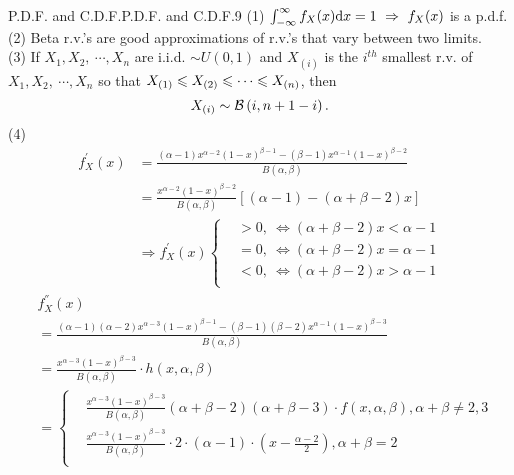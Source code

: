 \documentclass{elegantbook}
\begin{document}
\begin{remark}{P.D.F. and C.D.F.}{P.D.F. and C.D.F.9}
(1) $\int_{-\infty}^{\infty}{f_X(x)\dif x}=1\ \Rightarrow\ f_X(x)$ is a p.d.f.
\vspace{0.4cm}\\
(2) Beta r.v.'s are good approximations of r.v.'s that vary between two limits.\vspace{0.2cm}\\
(3) If $X_1,X_2,\ \cdots,X_n$ are i.i.d. $\sim U(0,1)$ and ${X}_{(i)}$ is the $i^{th}$ smallest r.v. of $X_1,X_2,\ \cdots,X_n$ so that $X_{(1)}\ls{X}_{(2)}\ls\cdots\ls X_{(n)}$, then
$$
{X}_{(i)}\sim\mb\left(i,n+1-i\right).
$$
(4)
$$\begin{aligned}
f_{X}^{'}(x) &= \frac{\left( \alpha - 1 \right)x^{\alpha - 2}\left( 1 - x \right)^{\beta - 1} - (\beta - 1)x^{\alpha - 1}{(1 - x)}^{\beta - 2}}{B(\alpha,\beta)}\\
&= \frac{x^{\alpha - 2}{(1 - x)}^{\beta - 2}}{B(\alpha,\beta)}\left\lbrack \left( \alpha - 1 \right) - \left( \alpha + \beta - 2 \right)x \right\rbrack\\
&\Rightarrow f_{X}^{'}(x)\left\{ \begin{aligned}
 &> 0,\ \Leftrightarrow \left( \alpha + \beta - 2 \right)x < \alpha - 1 \\
 &= 0,\ \Leftrightarrow \left( \alpha + \beta - 2 \right)x = \alpha - 1 \\
 &< 0,\ \Leftrightarrow \left( \alpha + \beta - 2 \right)x > \alpha - 1 \\
\end{aligned} \right.
\end{aligned}$$
$$\begin{aligned}
&f_{X}^{''}(x)\\
&= \frac{\left( \alpha - 1 \right)\left( \alpha - 2 \right)x^{\alpha - 3}\left( 1 - x \right)^{\beta - 1} - (\beta - 1)(\beta - 2)x^{\alpha - 1}{(1 - x)}^{\beta - 3}}{B(\alpha,\beta)}\\
&= \frac{x^{\alpha - 3}{(1 - x)}^{\beta - 3}}{B(\alpha,\beta)}\cdot h(x,\alpha,\beta)\\
&= \left\{ \begin{aligned}
&\frac{x^{\alpha - 3}\left( 1 - x \right)^{\beta - 3}}{B(\alpha,\beta)}\left( \alpha + \beta - 2 \right)\left( \alpha + \beta - 3 \right)\cdot f(x,\alpha,\beta),\alpha + \beta \neq 2,3 \\
&\frac{x^{\alpha - 3}\left( 1 - x \right)^{\beta - 3}}{B(\alpha,\beta)} \cdot 2 \cdot \left( \alpha - 1 \right) \cdot \left( x - \frac{\alpha - 2}{2} \right),\alpha + \beta = 2\\

\end{aligned}
\end{aligned}$$
\end{remark}
\end{document}
